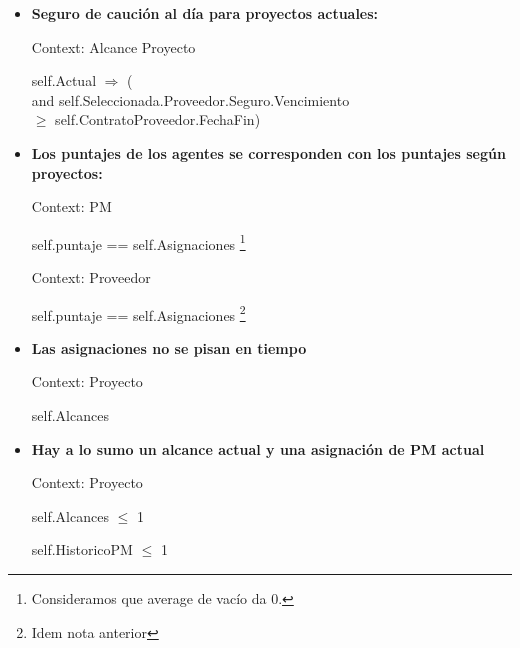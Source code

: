 \begin{itemize}
	\item \textbf{Seguro de caución al día para proyectos actuales:}
	
			Context: Alcance Proyecto
			
			self.Actual $\Rightarrow$ ( \\
			and self.Seleccionada.Proveedor.Seguro.Vencimiento	\\
			$\geq$ self.ContratoProveedor.FechaFin)	\\
			
			
	\item \textbf{Los puntajes de los agentes se corresponden con los puntajes seg\'un proyectos:}
			
			Context: PM
			
			self.puntaje ==	self.Asignaciones
			\footnote{Consideramos que average de vacío da 0.}
			
			Context: Proveedor
			
			self.puntaje ==	self.Asignaciones
			\footnote{Idem nota anterior}
			
	
	\item \textbf{Las asignaciones no se pisan en tiempo}
	
			Context: Proyecto
			
			self.Alcances
	
	\item \textbf{Hay a lo sumo un alcance actual y una asignación de PM actual}
	
			Context: Proyecto
			
			self.Alcances $\leq$ 1
			
			self.HistoricoPM $\leq$ 1
			

\end{itemize}
